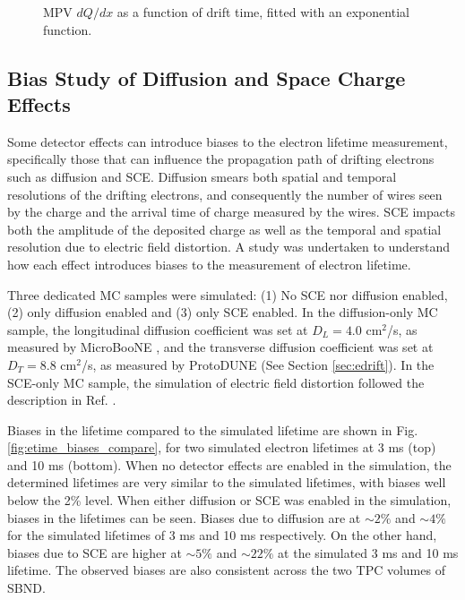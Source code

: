\begin{figure}[hb!]
\begin{subfigure}[b]{0.495\textwidth}
        \end{subfigure}
        \caption[Most Probable Value dQ/dx Against Drift Time]{MPV $dQ/dx$ as a function of drift time, fitted with an exponential function.}
        \label{fig:etime_tpc}
\end{figure}

\subsection{Bias Study of Diffusion and Space Charge Effects}
\label{sec7:etime_bias}

Some detector effects can introduce biases to the electron lifetime measurement, specifically those that can influence the propagation path of drifting electrons such as diffusion and SCE.
Diffusion smears both spatial and temporal resolutions of the drifting electrons, and consequently the number of wires seen by the charge and the arrival time of charge measured by the wires.
SCE impacts both the amplitude of the deposited charge as well as the temporal and spatial resolution due to electric field distortion.
A study was undertaken to understand how each effect introduces biases to the measurement of electron lifetime.

Three dedicated MC samples were simulated: (1) No SCE nor diffusion enabled, (2) only diffusion enabled and (3) only SCE enabled.
In the diffusion-only MC sample, the longitudinal diffusion coefficient was set at $D_{L} = 4.0 $ cm$^{2}$/s, as measured by MicroBooNE \cite{uboone_diff}, and the transverse diffusion coefficient was set at $D_T = 8.8 $ cm$^{2}$/s, as measured by ProtoDUNE \cite{protodune} (See Section \ref{sec:edrift}).     
In the SCE-only MC sample, the simulation of electric field distortion followed the description in Ref. \cite{SCE}.

Biases in the lifetime compared to the simulated lifetime are shown in Fig. \ref{fig:etime_biases_compare}, for two simulated electron lifetimes at 3 ms (top) and 10 ms (bottom).
When no detector effects are enabled in the simulation, the determined lifetimes are very similar to the simulated lifetimes, with biases well below the 2\% level.
When either diffusion or SCE was enabled in the simulation, biases in the lifetimes can be seen.
Biases due to diffusion are at $\sim 2\%$ and $\sim 4\%$ for the simulated lifetimes of 3 ms and 10 ms respectively.
On the other hand, biases due to SCE are higher at $\sim 5 \%$ and $\sim22 \%$ at the simulated 3 ms and 10 ms lifetime.
The observed biases are also consistent across the two TPC volumes of SBND.

